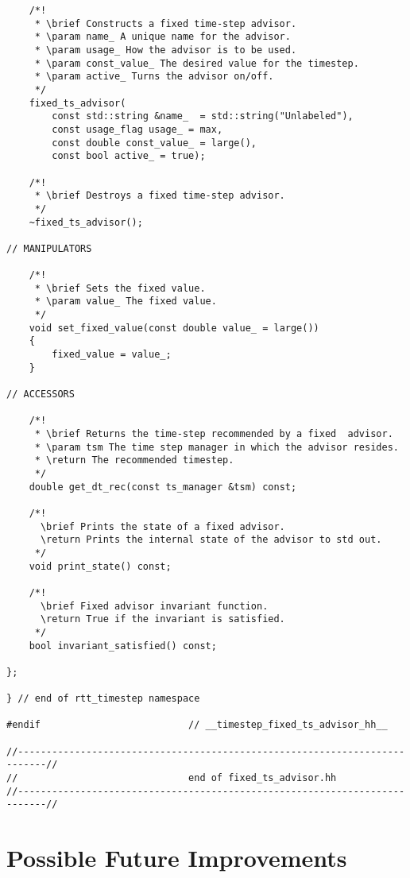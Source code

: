 \documentclass[11pt]{ResearchNote}
\begin{document}
\begin{verbatim}
    /*!
     * \brief Constructs a fixed time-step advisor.
     * \param name_ A unique name for the advisor.
     * \param usage_ How the advisor is to be used.
     * \param const_value_ The desired value for the timestep.
     * \param active_ Turns the advisor on/off.
     */
    fixed_ts_advisor( 
        const std::string &name_  = std::string("Unlabeled"),
        const usage_flag usage_ = max, 
        const double const_value_ = large(),
        const bool active_ = true);

    /*!
     * \brief Destroys a fixed time-step advisor.
     */
    ~fixed_ts_advisor();

// MANIPULATORS
    
    /*!
     * \brief Sets the fixed value.
     * \param value_ The fixed value.
     */
    void set_fixed_value(const double value_ = large())
    { 
        fixed_value = value_;
    }

// ACCESSORS

    /*!
     * \brief Returns the time-step recommended by a fixed  advisor.
     * \param tsm The time step manager in which the advisor resides.
     * \return The recommended timestep.
     */
    double get_dt_rec(const ts_manager &tsm) const;
    
    /*! 
      \brief Prints the state of a fixed advisor.
      \return Prints the internal state of the advisor to std out.
     */
    void print_state() const;
    
    /*! 
      \brief Fixed advisor invariant function.
      \return True if the invariant is satisfied.
     */
    bool invariant_satisfied() const;

};

} // end of rtt_timestep namespace

#endif                          // __timestep_fixed_ts_advisor_hh__

//---------------------------------------------------------------------------//
//                              end of fixed_ts_advisor.hh
//---------------------------------------------------------------------------//
\end{verbatim}


\section{Possible Future Improvements}
\end{document}
